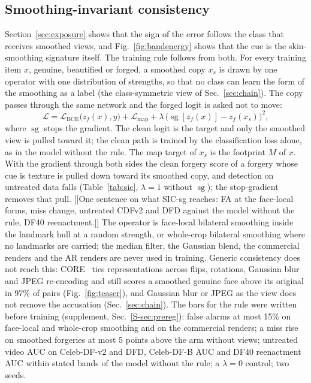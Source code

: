 \subsection{Smoothing-invariant consistency}
\label{sec:sic}
Section~\ref{sec:exposure} shows that the sign of the error follows the class that receives smoothed views, and
Fig.~\ref{fig:bandenergy} shows that the cue is the skin-smoothing signature itself. The training rule follows from both.
For every training item $x$, genuine, beautified or forged, a smoothed copy $x_s$ is drawn by one operator with one
distribution of strengths, so that no class can learn the form of the smoothing as a label (the class-symmetric view of
Sec.~\ref{sec:chain}). The copy passes through the same network and the forged logit is asked not to move:
\begin{equation}
\mathcal{L}=\mathcal{L}_\text{BCE}\big(z_f(x),y\big)+\mathcal{L}_\text{map}+\lambda\,\big(\operatorname{sg}[z_f(x)]-z_f(x_s)\big)^2,
\label{eq:sic}
\end{equation}
where $\operatorname{sg}$ stops the gradient. The clean logit is the target and only the smoothed view is pulled toward it;
the clean path is trained by the classification loss alone, as in the model without the rule. The map target of $x_s$ is the
footprint $M$ of $x$. With the gradient through both sides the clean forgery score of a forgery whose cue is texture is pulled
down toward its smoothed copy, and detection on untreated data falls (Table~\ref{tab:sic}, $\lambda=1$ without
$\operatorname{sg}$); the stop-gradient removes that pull. [[One sentence on what SIC-sg reaches: FA at the face-local forms,
miss change, untreated CDFv2 and DFD against the model without the rule, DF40 reenactment.]] The operator is face-local
bilateral smoothing inside the landmark hull at a random strength, or whole-crop bilateral smoothing where no landmarks are
carried; the median filter, the Gaussian blend, the commercial renders and the AR renders are never used in training.
Generic consistency does not reach this: CORE~\cite{core} ties representations across flips, rotations, Gaussian blur and JPEG
re-encoding and still scores a smoothed genuine face above its original in 97\% of pairs (Fig.~\ref{fig:teaser}), and
Gaussian blur or JPEG as the view does not remove the accusation (Sec.~\ref{sec:chain}). The bars for the rule were written
before training (supplement, Sec.~\ref{S-sec:prereg}): false alarms at most 15\% on face-local and whole-crop smoothing and on
the commercial renders; a miss rise on smoothed forgeries at most 5 points above the arm without views; untreated video AUC on
Celeb-DF-v2 and DFD, Celeb-DF-B AUC and DF40 reenactment AUC within stated bands of the model without the rule; a $\lambda=0$
control; two seeds.
